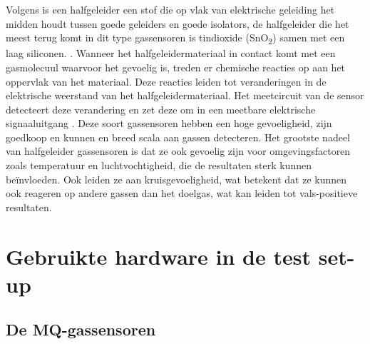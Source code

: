 Volgens
is een halfgeleider een stof die op vlak van elektrische geleiding het midden houdt tussen goede geleiders en goede isolators, de halfgeleider die het meest terug komt in dit type gassensoren is tindioxide (SnO\textsubscript{2}) samen met een laag siliconen.
. Wanneer het halfgeleidermateriaal in contact komt met een gasmolecuul waarvoor het gevoelig is, treden er chemische reacties op aan het oppervlak van het materiaal. Deze reacties leiden tot veranderingen in de elektrische weerstand van het halfgeleidermateriaal. Het meetcircuit van de sensor detecteert deze verandering en zet deze om in een meetbare elektrische signaaluitgang
. Deze soort gassensoren hebben een hoge gevoeligheid, zijn goedkoop en kunnen en breed scala aan gassen detecteren. Het grootste nadeel van halfgeleider gassensoren is dat ze ook gevoelig zijn voor omgevingsfactoren zoals temperatuur en luchtvochtigheid, die de resultaten sterk kunnen beïnvloeden. Ook leiden ze aan kruisgevoeligheid, wat betekent dat ze kunnen ook reageren op andere gassen dan het doelgas, wat kan leiden tot vals-positieve resultaten.






\section{Gebruikte hardware in de test set-up}
\label{sec:hardware}


\subsection{De MQ-gassensoren}%
\label{subsec:werking-MQ}


